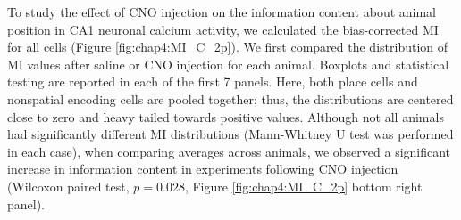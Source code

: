 To study the effect of CNO injection on the information content about animal position in CA1 neuronal calcium activity, we calculated the bias-corrected MI for all cells (Figure \ref{fig:chap4:MI_C_2p}).
We first compared the distribution of MI values after saline or CNO injection for each animal.
Boxplots and statistical testing are reported in each of the first 7 panels.
Here, both place cells and nonspatial encoding cells are pooled together; thus, the distributions are centered close to zero and heavy tailed towards positive values. 
Although not all animals had significantly different MI distributions (Mann-Whitney U test was performed in each case), when comparing averages across animals, we observed a significant increase in information content in experiments following CNO injection (Wilcoxon paired test, $p=0.028$, Figure \ref{fig:chap4:MI_C_2p} bottom right panel).

